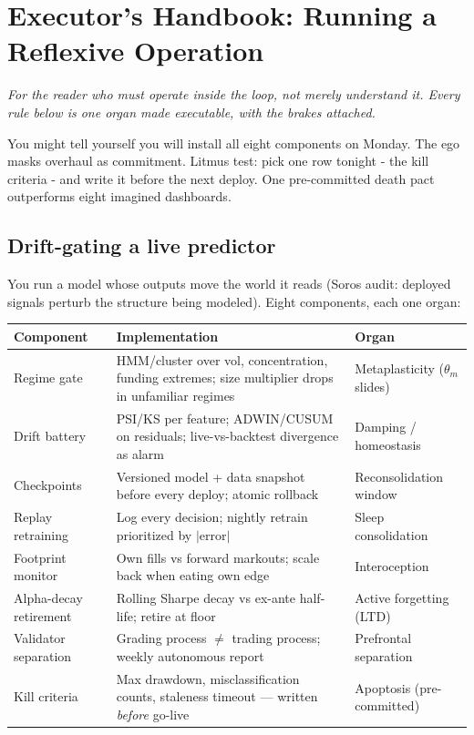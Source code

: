\chapter{Executor's Handbook: Running a Reflexive Operation}

\textit{For the reader who must operate inside the loop, not merely understand it. Every rule below is one organ made executable, with the brakes attached.}

You might tell yourself you will install all eight components on Monday. The ego masks overhaul as commitment. Litmus test: pick one row tonight - the kill criteria - and write it before the next deploy. One pre-committed death pact outperforms eight imagined dashboards.

\section{Drift-gating a live predictor}

You run a model whose outputs move the world it reads (Soros audit: deployed signals perturb the structure being modeled). Eight components, each one organ:

\begin{center}
\small
\begin{tabular}{p{2.6cm}p{4.4cm}p{4.6cm}}
\toprule
Component & Implementation & Organ \\
\midrule
Regime gate & HMM/cluster over vol, concentration, funding extremes; size multiplier drops in unfamiliar regimes & Metaplasticity ($\theta_m$ slides) \\
Drift battery & PSI/KS per feature; ADWIN/CUSUM on residuals; live-vs-backtest divergence as alarm & Damping / homeostasis \\
Checkpoints & Versioned model + data snapshot before every deploy; atomic rollback & Reconsolidation window \\
Replay retraining & Log every decision; nightly retrain prioritized by $|$error$|$ & Sleep consolidation \\
Footprint monitor & Own fills vs forward markouts; scale back when eating own edge & Interoception \\
Alpha-decay retirement & Rolling Sharpe decay vs ex-ante half-life; retire at floor & Active forgetting (LTD) \\
Validator separation & Grading process $\neq$ trading process; weekly autonomous report & Prefrontal separation \\
Kill criteria & Max drawdown, misclassification counts, staleness timeout --- written \textit{before} go-live & Apoptosis (pre-committed) \\
\bottomrule
\end{tabular}
\end{center}

